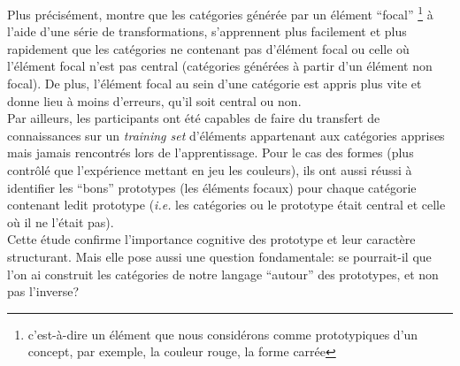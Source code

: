 \documentclass[french]{article}
\begin{document}
					Plus précisément, \cite{rosch1973} montre que les catégories générée par un élément ``focal'' \footnote{c'est-à-dire un élément que nous considérons comme prototypiques d'un concept, par exemple, la couleur rouge, la forme carrée} à l'aide d'une série de transformations, s'apprennent plus facilement et plus rapidement que les catégories ne contenant pas d'élément focal ou celle où l'élément focal n'est pas central (catégories générées à partir d'un élément non focal). De plus, l'élément focal au sein d'une catégorie est appris plus vite et donne lieu à moins d'erreurs, qu'il soit central ou non.\\
					
					Par ailleurs, les participants ont été capables de faire du transfert de connaissances sur un \textit{training set} d'éléments appartenant aux catégories apprises mais jamais rencontrés lors de l'apprentissage. Pour le cas des formes (plus contrôlé que l'expérience mettant en jeu les couleurs), ils ont aussi réussi à identifier les ``bons'' prototypes (les éléments focaux) pour chaque catégorie contenant ledit prototype (\textit{i.e.} les catégories ou le prototype était central et celle où il ne l'était pas).\\
					
					Cette étude confirme l'importance cognitive des prototype et leur caractère structurant. Mais elle pose aussi une question fondamentale: se pourrait-il que l'on ai construit les catégories de notre langage ``autour'' des prototypes, et non pas l'inverse?
\end{document}
